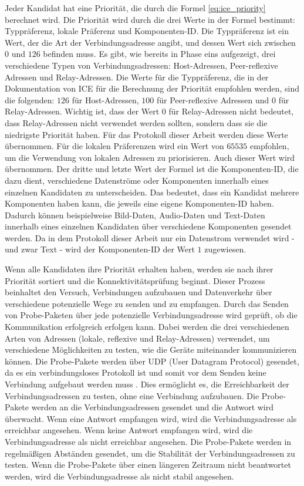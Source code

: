 \noindent Jeder Kandidat hat eine Priorität, die durch die Formel \ref{eq:ice_priority} berechnet wird. Die Priorität wird durch die drei Werte in der Formel bestimmt: Typpräferenz, lokale Präferenz und Komponenten-ID. Die Typpräferenz ist ein Wert, der die Art der Verbindungsadresse angibt, und dessen Wert sich zwischen $0$ und $126$ befinden muss.
Es gibt, wie bereits in Phase eins aufgezeigt, drei verschiedene Typen von Verbindungsadressen: Host-Adressen, Peer-reflexive Adressen und Relay-Adressen.
Die Werte für die Typpräferenz, die in der Dokumentation von ICE für die Berechnung der Priorität empfohlen werden, sind die folgenden: $126$ für Host-Adressen, $100$ für Peer-reflexive Adressen und $0$ für Relay-Adressen. Wichtig ist, dass der Wert $0$ für Relay-Adressen nicht bedeutet, dass Relay-Adressen nicht verwendet werden sollten, sondern dass sie die niedrigste Priorität haben. Für das Protokoll dieser Arbeit werden diese Werte übernommen. Für die lokalen Präferenzen wird ein Wert von $65535$ empfohlen, um die Verwendung von lokalen Adressen zu priorisieren. Auch dieser Wert wird übernommen. Der dritte und letzte Wert der Formel ist die Komponenten-ID, die dazu dient, verschiedene Datenströme oder Komponenten innerhalb eines einzelnen Kandidaten zu unterscheiden. Das bedeutet, dass ein Kandidat mehrere Komponenten haben kann, die jeweils eine eigene Komponenten-ID haben. Dadurch können beispielweise Bild-Daten, Audio-Daten und Text-Daten innerhalb eines einzelnen Kandidaten über verschiedene Komponenten gesendet werden. Da in dem Protokoll dieser Arbeit nur ein Datenstrom verwendet wird - und zwar Text - wird der Komponenten-ID der Wert $1$ zugewiesen.

Wenn alle Kandidaten ihre Priorität erhalten haben, werden sie nach ihrer Priorität sortiert und die Konnektivitätsprüfung beginnt. Dieser Prozess beinhaltet den Versuch, Verbindungen aufzubauen und Datenverkehr über verschiedene potenzielle Wege zu senden und zu empfangen.
Durch das Senden von Probe-Paketen über jede potenzielle Verbindungsadresse wird geprüft, ob die Kommunikation erfolgreich erfolgen kann. Dabei werden die drei verschiedenen Arten von Adressen (lokale, reflexive und Relay-Adressen) verwendet, um verschiedene Möglichkeiten zu testen, wie die Geräte miteinander kommunizieren können. Die Probe-Pakete werden über UDP (User Datagram Protocol) gesendet, da es ein verbindungsloses Protokoll ist und somit vor dem Senden keine Verbindung aufgebaut werden muss \parencite[S. 1]{rfc768_UDP}. Dies ermöglicht es, die Erreichbarkeit der Verbindungsadressen zu testen, ohne eine Verbindung aufzubauen. Die Probe-Pakete werden an die Verbindungsadressen gesendet und die Antwort wird überwacht. Wenn eine Antwort empfangen wird, wird die Verbindungsadresse als erreichbar angesehen. Wenn keine Antwort empfangen wird, wird die Verbindungsadresse als nicht erreichbar angesehen. Die Probe-Pakete werden in regelmäßigen Abständen gesendet, um die Stabilität der Verbindungsadressen zu testen. Wenn die Probe-Pakete über einen längeren Zeitraum nicht beantwortet werden, wird die Verbindungsadresse als nicht stabil angesehen. 

